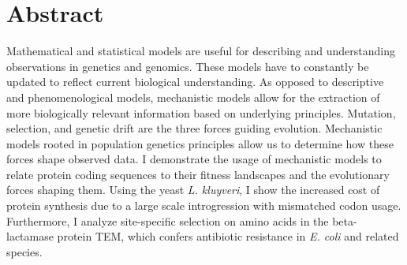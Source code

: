 \chapter*{Abstract}\label{ch:abstract}

Mathematical and statistical models are useful for describing and understanding observations in genetics and genomics.
These models have to constantly be updated to reflect current biological understanding.
As opposed to descriptive and phenomenological models, mechanistic models allow for the extraction of more biologically relevant information based on underlying principles.
Mutation, selection, and genetic drift are the three forces guiding evolution.
Mechanistic models rooted in population genetics principles allow us to determine how these forces shape observed data.
I demonstrate the usage of mechanistic models to relate protein coding sequences to their fitness landscapes and the evolutionary forces shaping them.
Using the yeast \textit{L. kluyveri}, I show the increased cost of protein synthesis due to a large scale introgression with mismatched codon usage.
Furthermore, I analyze site-specific selection on amino acids in the beta-lactamase protein TEM, which confers antibiotic resistance in \textit{E. coli} and related species. 


